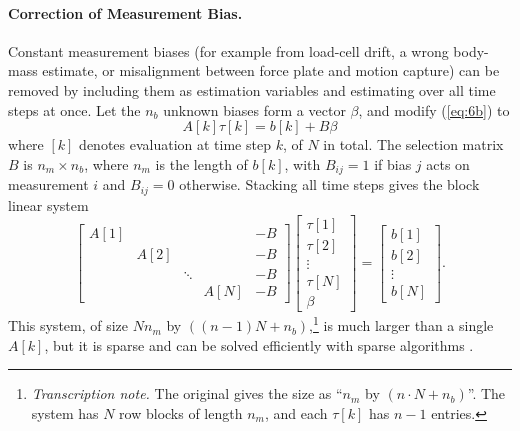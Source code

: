 \documentclass[11pt]{article}
\newcommand{\tnote}[1]{\footnote{\textit{Transcription note.} #1}}
\begin{document}
\paragraph{Correction of Measurement Bias.} Constant measurement biases (for
example from load-cell drift, a wrong body-mass estimate, or misalignment
between force plate and motion capture) can be removed by including them as
estimation variables and estimating over all time steps at once. Let the
$n_b$ unknown biases form a vector $\beta$, and modify (\ref{eq:6b}) to
\begin{equation}
A[k]\tau[k] = b[k] + B\beta
\label{eq:9}
\end{equation}
where $[k]$ denotes evaluation at time step $k$, of $N$ in total. The
selection matrix $B$ is $n_m\times n_b$, where $n_m$ is the length of $b[k]$,
with $B_{ij}=1$ if bias $j$ acts on measurement $i$ and $B_{ij}=0$ otherwise.
Stacking all time steps gives the block linear system
\begin{equation}
\begin{bmatrix}
A[1] & & & & -B\\
& A[2] & & & -B\\
& & \ddots & & -B\\
& & & A[N] & -B
\end{bmatrix}
\begin{bmatrix}\tau[1]\\ \tau[2]\\ \vdots\\ \tau[N]\\ \beta\end{bmatrix}
= \begin{bmatrix}b[1]\\ b[2]\\ \vdots\\ b[N]\end{bmatrix}.
\label{eq:10}
\end{equation}
This system, of size $N n_m$ by $((n-1)N+n_b)$,\tnote{The original gives the
size as ``$n_m$ by $(n\cdot N+n_b)$''. The system has $N$ row blocks of
length $n_m$, and each $\tau[k]$ has $n-1$ entries.} is much larger than a
single $A[k]$, but it is sparse and can be solved efficiently with sparse
algorithms \cite{GolubVanLoan1989}.
\end{document}

